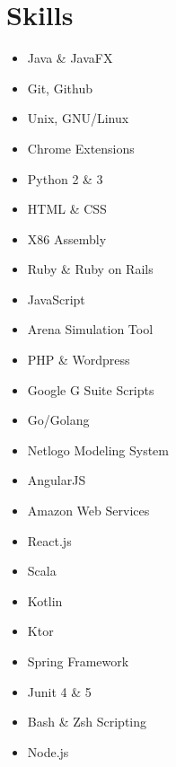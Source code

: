 \documentclass{article}
\begin{document}
\section{Skills}

\begin{itemize}
    \item Java \& JavaFX
    \item Git, Github
    \item Unix, GNU/Linux
    \item Chrome Extensions
    \item Python 2 \& 3
    \item HTML \& CSS
    \item X86 Assembly
    \item Ruby \& Ruby on Rails
    \item JavaScript
    \item Arena Simulation Tool
    \item PHP \& Wordpress
    \item Google G Suite Scripts
    \item Go/Golang
    \item Netlogo Modeling System
    \item AngularJS
    \item Amazon Web Services
    \item React.js
    \item Scala
    \item Kotlin
    \item Ktor
    \item Spring Framework
    \item Junit 4 \& 5
    \item Bash \& Zsh Scripting
    \item Node.js
\end{itemize}
\end{document}
